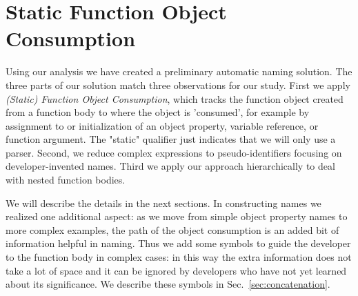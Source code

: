 \documentclass[10pt, preprint]{sigplanconf}
\begin{document}
\section{Static  Function Object Consumption}
\label{sec:foc}
Using our analysis we have created a preliminary automatic naming solution.  The three parts of our solution match three observations for our study. First we apply 
 \textit{(Static) Function Object Consumption}, which tracks the function object created from a function body to where the object is 'consumed', for example by assignment to or initialization of  an object property, variable reference, or function argument. The "static" qualifier just indicates that we will only use a parser.  Second, we reduce complex expressions to pseudo-identifiers focusing on developer-invented names.  Third we apply our approach hierarchically to  deal with nested function bodies.

We will describe the details in the next sections. In constructing names we realized one additional aspect: as we move from simple object property names to more complex examples, the path of the object consumption is an added bit of information helpful in naming. Thus we add some symbols to guide the developer to the function body in complex cases: in this way the extra information does not take a lot of space and it can be ignored by developers who have not yet learned about its significance. We describe these symbols in Sec.~\ref{sec:concatenation}.


 
\end{document}
